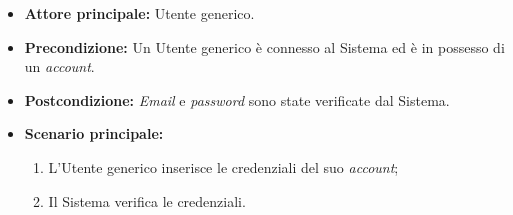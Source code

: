 \label{usecase:Accesso tradizionale}
\begin{itemize}

	\item \textbf{Attore principale:} Utente generico.

	\item \textbf{Precondizione:} Un Utente generico è connesso al Sistema ed è in possesso di un \textit{account}.

	\item \textbf{Postcondizione:} \textit{Email} e \textit{password} sono state verificate dal Sistema.

	\item \textbf{Scenario principale:}
	\begin{enumerate}
		\item L'Utente generico inserisce le credenziali del suo \textit{account};
		\item Il Sistema verifica le credenziali.
	\end{enumerate}

\end{itemize}
